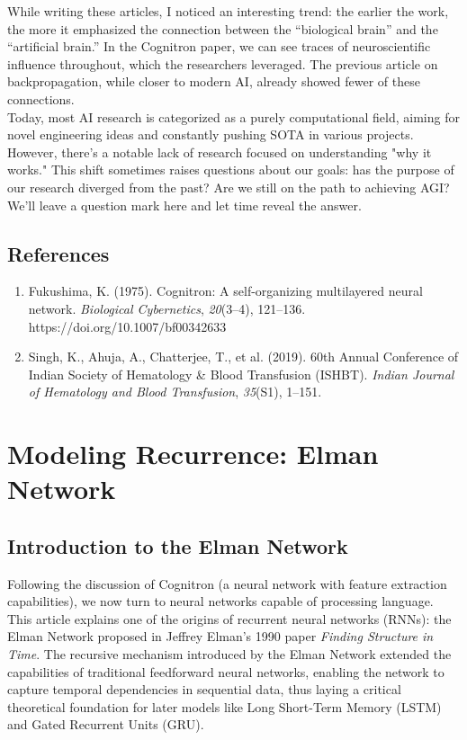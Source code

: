 \documentclass[11p,oneside]{book}
\begin{document}
While writing these articles, I noticed an interesting trend: the earlier the work, the more it emphasized the connection between the “biological brain” and the “artificial brain.” In the Cognitron paper, we can see traces of neuroscientific influence throughout, which the researchers leveraged. The previous article on backpropagation, while closer to modern AI, already showed fewer of these connections. \\

Today, most AI research is categorized as a purely computational field, aiming for novel engineering ideas and constantly pushing SOTA in various projects. However, there’s a notable lack of research focused on understanding "why it works." This shift sometimes raises questions about our goals: has the purpose of our research diverged from the past? Are we still on the path to achieving AGI? We’ll leave a question mark here and let time reveal the answer. 

\section*{References}

\begin{enumerate}
    \item Fukushima, K. (1975). Cognitron: A self-organizing multilayered neural network. \textit{Biological Cybernetics}, \textit{20}(3–4), 121–136. {https://doi.org/10.1007/bf00342633}
    \item Singh, K., Ahuja, A., Chatterjee, T., et al. (2019). 60th Annual Conference of Indian Society of Hematology \& Blood Transfusion (ISHBT). \textit{Indian Journal of Hematology and Blood Transfusion}, \textit{35}(S1), 1–151.
\end{enumerate}

\chapter{Modeling Recurrence: Elman Network}


\section*{Introduction to the Elman Network}

Following the discussion of Cognitron (a neural network with feature extraction capabilities), we now turn to neural networks capable of processing language. This article explains one of the origins of recurrent neural networks (RNNs): the Elman Network proposed in Jeffrey Elman’s 1990 paper \textit{Finding Structure in Time}. The recursive mechanism introduced by the Elman Network extended the capabilities of traditional feedforward neural networks, enabling the network to capture temporal dependencies in sequential data, thus laying a critical theoretical foundation for later models like Long Short-Term Memory (LSTM) and Gated Recurrent Units (GRU). \\
\end{document}
